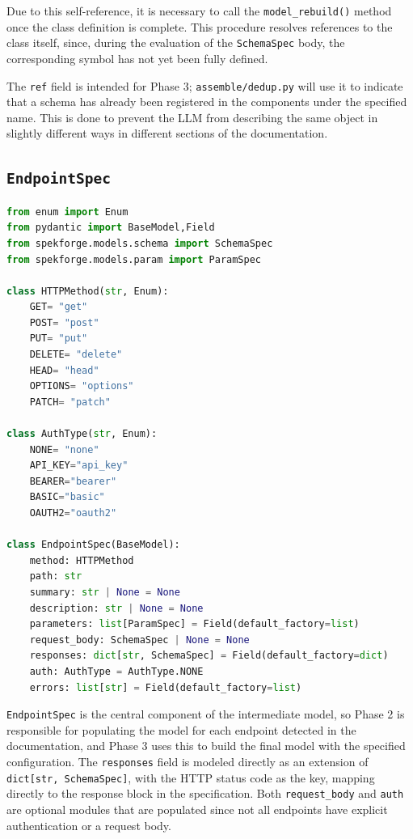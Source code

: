 Due to this self-reference, it is necessary to call the \texttt{model\_rebuild()} method once the class definition 
is complete. This procedure resolves references to the class 
itself, since, during the evaluation of the \texttt{SchemaSpec} 
body, the corresponding symbol has not yet been fully defined.

The \texttt{ref} field is intended for Phase 3; \texttt{assemble/dedup.py}
will use it to indicate that a schema has already been registered in the components
under the specified name. This is done to prevent the LLM from describing the same
object in slightly different ways in different sections of the documentation.

\subsection{\texttt{EndpointSpec}}

\begin{lstlisting}[language=Python, caption={\texttt{src/spekforge/models/endpoint.py}}]
from enum import Enum
from pydantic import BaseModel,Field
from spekforge.models.schema import SchemaSpec
from spekforge.models.param import ParamSpec

class HTTPMethod(str, Enum):
    GET= "get"
    POST= "post"
    PUT= "put"
    DELETE= "delete"
    HEAD= "head"
    OPTIONS= "options"
    PATCH= "patch"

class AuthType(str, Enum):
    NONE= "none"
    API_KEY="api_key"
    BEARER="bearer"
    BASIC="basic"
    OAUTH2="oauth2" 

class EndpointSpec(BaseModel):
    method: HTTPMethod
    path: str
    summary: str | None = None
    description: str | None = None
    parameters: list[ParamSpec] = Field(default_factory=list)
    request_body: SchemaSpec | None = None
    responses: dict[str, SchemaSpec] = Field(default_factory=dict)
    auth: AuthType = AuthType.NONE
    errors: list[str] = Field(default_factory=list)
\end{lstlisting}

\texttt{EndpointSpec} is the central component of the intermediate model, so
Phase 2 is responsible for populating the model for each endpoint detected in the documentation,
and Phase 3 uses this to build the final model with the specified
configuration. The \texttt{responses} field is modeled directly as an
extension of \texttt{dict[str, SchemaSpec]}, with the HTTP status code
as the key, mapping directly to the response block in the specification.
Both \texttt{request\_body} and \texttt{auth} are optional modules that are populated
since not all endpoints have explicit authentication or a request body.

